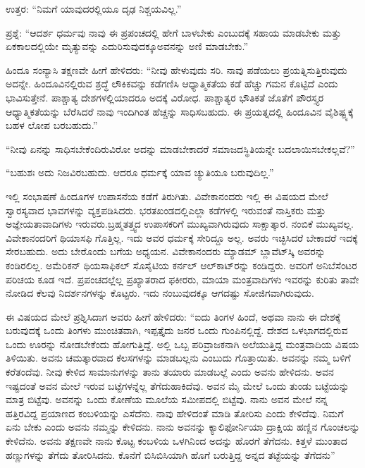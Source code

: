 \vskip 3pt

ಉತ್ತರ: “ನಿಮಗೆ ಯಾವುದರಲ್ಲಿಯೂ ದೃಢ ನಿಶ್ಚಯವಿಲ್ಲ.”

\vskip 3pt

ಪ್ರಶ್ನೆ: “ಆದರ್ಶ ಧರ್ಮವು ನಾವು ಈ ಪ್ರಪಂಚದಲ್ಲಿ ಹೇಗೆ ಬಾಳಬೇಕು ಎಂಬುದಕ್ಕೆ ಸಹಾಯ ಮಾಡಬೇಕು ಮತ್ತು ಏಕಕಾಲದಲ್ಲಿಯೇ ಮೃತ್ಯುವನ್ನು ಎದುರಿಸುವುದಕ್ಕೂ\break ಅವನನ್ನು ಅಣಿ ಮಾಡಬೇಕು.”

\vskip 3pt

ಹಿಂದೂ ಸಂನ್ಯಾಸಿ ತಕ್ಷಣವೇ ಹೀಗೆ ಹೇಳಿದರು: “ನೀವು ಹೇಳುವುದು ಸರಿ. ನಾವು ಪಡೆಯಲು ಪ್ರಯತ್ನಿಸುತ್ತಿರುವುದು ಅದನ್ನೇ. ಹಿಂದೂವಿನಲ್ಲಿರುವ ಶ್ರದ್ಧೆ ಲೌಕಿಕವನ್ನು ಕಡೆಗಣಿಸಿ ಆಧ್ಯಾತ್ಮಿಕತೆಯ ಕಡೆ ಹೆಚ್ಚು ಗಮನ ಕೊಟ್ಟಿದೆ ಎಂದು ಭಾವಿಸುತ್ತೇನೆ. ಪಾಶ್ಚಾತ್ಯ ದೇಶಗಳಲ್ಲಿಯಾದರೂ ಅದಕ್ಕೆ ವಿರೋಧ. ಪಾಶ್ಚಾತ್ಯರ ಭೌತಿಕತೆ ಜೊತೆಗೆ ಪೌರಸ್ತ್ಯರ ಆಧ್ಯಾತ್ಮಿಕತೆಯನ್ನು ಬೆರೆಸಿದರೆ ನಾವು ಇಂದಿಗಿಂತ ಹೆಚ್ಚನ್ನು ಸಾಧಿಸಬಹುದು. ಈ ಪ್ರಯತ್ನದಲ್ಲಿ ಹಿಂದೂವಿನ ವೈಶಿಷ್ಟ್ಯಕ್ಕೆ ಬಹಳ ಲೋಪ ಬರಬಹುದು.”

\vskip 3pt

“ನೀವು ಏನನ್ನು ಸಾಧಿಸಬೇಕೆಂದಿರುವಿರೋ ಅದನ್ನು ಮಾಡಬೇಕಾದರೆ ಸಮಾಜದ\break ಸ್ಥಿತಿಯನ್ನೇ ಬದಲಾಯಿಸಬೇಕಲ್ಲವೆ?”

\vskip 3pt

“ಬಹುಶಃ ಅದು ನಿಜವಿರಬಹುದು. ಆದರೂ ಧರ್ಮಕ್ಕೆ ಯಾವ ಚ್ಯುತಿಯೂ ಬರುವುದಿಲ್ಲ.”

\vskip 3pt

ಇಲ್ಲಿ ಸಂಭಾಷಣೆ ಹಿಂದೂಗಳ ಉಪಾಸನೆಯ ಕಡೆಗೆ ತಿರುಗಿತು. ವಿವೇಕಾನಂದರು ಇಲ್ಲಿ ಈ ವಿಷಯದ ಮೇಲೆ ಸ್ವಾರಸ್ಯವಾದ ಭಾವಗಳನ್ನು ವ್ಯಕ್ತಪಡಿಸಿದರು. ಭರತಖಂಡದಲ್ಲಿ\break ಎಲ್ಲಾ ಕಡೆಗಳಲ್ಲಿ ಇರುವಂತೆ ನಾಸ್ತಿಕರು ಮತ್ತು ಅಜ್ಞೇಯತಾವಾದಿಗಳು ಇರುವರು.\break ಬ್ರಹ್ಮತತ್ತ್ವದ ಉಪಾಸಕರಿಗೆ ಮುಖ್ಯವಾಗಿರುವುದು ಸಾಕ್ಷಾತ್ಕಾರ. ನಂಬಿಕೆ ಮುಖ್ಯವಲ್ಲ. ವಿವೇಕಾನಂದರಿಗೆ ಥಿಯಾಸಫಿ ಗೊತ್ತಿಲ್ಲ. ಇದು ಅವರ ಧರ್ಮಕ್ಕೆ ಸೇರಿದ್ದೂ ಅಲ್ಲ. ಅವರು ಇಚ್ಛಿಸಿದರೆ ಬೇಕಾದರೆ ಇದಕ್ಕೆ ಸೇರಬಹುದು. ಅದು ಬೇರೊಂದು ಬಗೆಯ ಅಧ್ಯಯನ. ವಿವೇಕಾನಂದರು ಮ್ಯಾಡಮ್​ ಬ್ಲಾವೆಟ್​ಸ್ಕಿ ಅವರನ್ನು ಕಂಡಿರಲಿಲ್ಲ. ಅಮೆರಿಕನ್​ ಥಿಯಸಾಫಿಕಲ್​ ಸೊಸೈಟಿಯ ಕರ್ನಲ್​ ಆಲ್​ಕಾಟ್​ರನ್ನು ಕಂಡಿದ್ದರು. ಅವರಿಗೆ ಅನಿಬೆಸೆಂಟರ ಪರಿಚಯ ಕೂಡ ಇದೆ. ಪ್ರಪಂಚದಲ್ಲೆಲ್ಲ ಪ್ರಖ್ಯಾತರಾದ ಫಕೀರರು, ಮಾಯಾ ಮಂತ್ರವಾದಿಗಳು ಇವರನ್ನು ಕುರಿತು ತಾವೇ ನೋಡಿದ ಕೆಲವು ನಿದರ್ಶನಗಳನ್ನು ಕೊಟ್ಟರು. ಇದು ನಂಬುವುದಕ್ಕೂ ಆಗದಷ್ಟು ಸೋಜಿಗವಾಗಿರುವುದು.

\vskip 3pt

ಈ ವಿಷಯದ ಮೇಲೆ ಪ್ರಶ್ನಿಸಿದಾಗ ಅವರು ಹೀಗೆ ಹೇಳಿದರು: “ಐದು ತಿಂಗಳ ಹಿಂದೆ, ಅಥವಾ ನಾನು ಈ ದೇಶಕ್ಕೆ ಬರುವುದಕ್ಕೆ ಒಂದು ತಿಂಗಳು ಮುಂಚಿತವಾಗಿ, ಇಪ್ಪತ್ತೈದು ಜನರ ಒಂದು ಗುಂಪಿನಲ್ಲಿದ್ದೆ. ದೇಶದ ಒಳಭಾಗದಲ್ಲಿರುವ ಒಂದು ಊರನ್ನು ನೋಡಬೇಕೆಂದು ಹೋಗುತ್ತಿದ್ದೆ. ಅಲ್ಲಿ ಒಬ್ಬ ಪರಿವ್ರಾಜಕನಾಗಿ ಅಲೆಯುತ್ತಿದ್ದ ಮಂತ್ರವಾದಿಯ ವಿಷಯ ತಿಳಿಯಿತು. ಅವನು ಚಮತ್ಕಾರವಾದ ಕೆಲಸಗಳನ್ನು ಮಾಡಬಲ್ಲನು ಎಂಬುದು ಗೊತ್ತಾಯಿತು. ಅವನನ್ನು ನಮ್ಮ ಬಳಿಗೆ ಕರೆತಂದೆವು. ನೀವು ಕೇಳಿದ ಸಾಮಾನುಗಳನ್ನು ತಾನು ತಯಾರು ಮಾಡಬಲ್ಲೆ ಎಂದು ಅವನು ಹೇಳಿದನು. ಅವನ ಇಷ್ಟದಂತೆ ಅವನ ಮೇಲೆ ಇರುವ ಬಟ್ಟೆಗಳನ್ನೆಲ್ಲ ತೆಗೆದುಹಾಕಿದೆವು. ಅವನ ಮೈ ಮೇಲೆ ಒಂದು ತುಂಡು ಬಟ್ಟೆಯನ್ನು ಮಾತ್ರ ಬಿಟ್ಟೆವು. ಅವನನ್ನು ಒಂದು ಕೋಣೆಯ ಮೂಲೆಯ ಸಮೀಪದಲ್ಲಿ ಬಿಟ್ಟೆವು. ನಾನು ಅವನ ಮೇಲೆ ನನ್ನ ಹತ್ತಿರವಿದ್ದ ಪ್ರಯಾಣದ ಕಂಬಳಿಯನ್ನು ಎಸೆದೆನು. ನಾವು ಹೇಳಿದಂತೆ ಮಾಡಿ ತೋರಿಸು ಎಂದು ಕೇಳಿದೆವು. ನಿಮಗೆ ಏನು ಬೇಕು ಎಂದು ಅವನು ನಮ್ಮನ್ನು ಕೇಳಿದನು. ನಾನು ಅವನನ್ನು ಕ್ಯಾಲಿಫೋರ್ನಿಯಾ ದ್ರಾಕ್ಷಿಯ ಹಣ್ಣಿನ ಗೊಂಚಲನ್ನು ಕೇಳಿದೆನು. ಅವನು ತಕ್ಷಣವೇ ನಾನು ಕೊಟ್ಟ ಕಂಬಳಿಯ ಒಳಗಿನಿಂದ ಅದನ್ನು ಹೊರಗೆ ತೆಗೆದನು. ಕಿತ್ತಳೆ ಮುಂತಾದ ಹಣ್ಣುಗಳನ್ನು ತೆಗೆದು ತೋರಿಸಿದನು. ಕೊನೆಗೆ ಬಿಸಿಬಿಸಿಯಾಗಿ ಹೊಗೆ ಬರುತ್ತಿದ್ದ ಅನ್ನದ ತಟ್ಟೆಯನ್ನು ತೆಗೆದನು”


